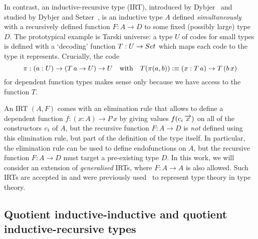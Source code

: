 \documentclass[a4paper,UKenglish,numberwithinsect,cleveref,thm-restate]{lipics-v2021}
\newcommand{\LT}[2][]{\todo[inline,author={L-T},caption={},color={pink},#1]{#2}}
\begin{document}
In contrast, an inductive-recursive type (IRT), introduced by Dybjer~\cite{Dybjer2000} and studied by Dybjer and Setzer~\cite{Dybjer1999,Dybjer2003}, is an inductive type $A$ defined \emph{simultaneously} with a recursively defined function $F : A \to D$ to some fixed (possibly large) type $D$.
The prototypical example is Tarski universe: a type $U$ of codes for small types is defined with a `decoding' function $T : U \to \Set$ which maps each code to the type it represents. Crucially, the code
\[
  \pi : (a : U) \to (T\,a \to U) \to U
  \quad\text{with}\quad T(\pi(a, b)) \vcentcolon\equiv (x : T\,a) \to T\,(b\, x)
\]
for dependent function types makes sense only because we have access to the function $T$.
%

An IRT $(A, F)$ comes with an elimination rule that allows to define a dependent function  $f : (x : A) \to P\,x$ by giving values $f(\cc_i\,\overrightarrow{x})$ on all of the constructors $\cc_i$ of $A$, but the recursive function $F : A \to D$ is \emph{not} defined using this elimination rule, but part of the definition of the type itself.
%
In particular, the elimination rule can be used to define endofunctions on $A$, but the recursive function  $F : A \to D$ must target a pre-existing type $D$.
%
In this work, we will consider an extension of \emph{generalised} IRTs, where $F : A \to A$ is also allowed.
%
Such IRTs are accepted in \Agda and were previously used~\cite{Danielsson2006} to represent type theory in type theory.
%



\subsection{Quotient inductive-inductive and quotient inductive-recursive types}
\end{document}
